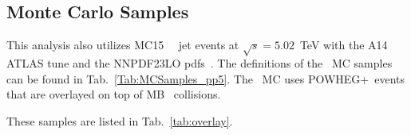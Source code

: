 
\subsection{Monte Carlo Samples}

 

This analysis also utilizes MC15 \pythiaeight\ \pp\ jet events at $\sqrt{s} =5.02$~TeV with the A14 ATLAS tune and the NNPDF23LO pdfs~\cite{ATLAS2014021}.
The definitions of the \pp\ MC samples can be found in Tab.~\ref{Tab:MCSamples_pp5}.
The \pbpb\ MC uses POWHEG+\pythiaeight\ events that are overlayed on top of MB \PbPb\ collisions.
 
These samples are listed in Tab.~\ref{tab:overlay}.


